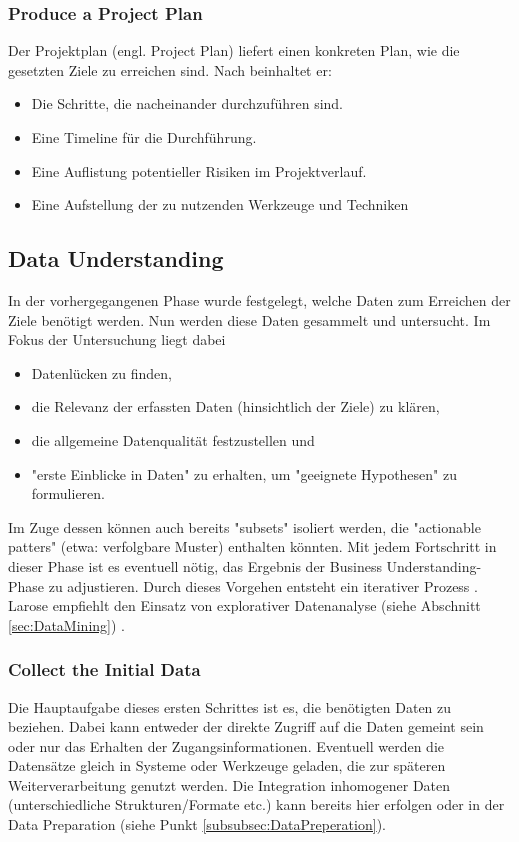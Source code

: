 \subsubsection{Produce a Project Plan}
Der Projektplan (engl. Project Plan) liefert einen konkreten Plan, wie die gesetzten Ziele zu erreichen sind. Nach \citep[S.~15]{shearer_crisp-dm_2000} beinhaltet er:
\begin{itemize}
\item Die Schritte, die nacheinander durchzuführen sind.
\item Eine Timeline für die Durchführung.
\item Eine Auflistung potentieller Risiken im Projektverlauf.
\item Eine Aufstellung der zu nutzenden Werkzeuge und Techniken \citep[S.~16]{chapman_crisp-dm_2000}
\end{itemize}


\subsection{Data Understanding}
In der vorhergegangenen Phase wurde festgelegt, welche Daten zum Erreichen der Ziele benötigt werden. Nun werden diese Daten gesammelt und untersucht. Im Fokus der Untersuchung liegt dabei\citep[S.~73]{swamynathan_mastering_2017}
\begin{itemize}
\item Datenlücken zu  finden,
\item die Relevanz der erfassten Daten (hinsichtlich der Ziele) zu klären,
\item die allgemeine Datenqualität festzustellen und
\item "erste Einblicke in Daten" zu erhalten, um "geeignete Hypothesen"\citep[S.~73; eigene Übersetzung]{swamynathan_mastering_2017} zu formulieren.
\end{itemize}
Im Zuge dessen können auch bereits "subsets" isoliert werden, die "actionable patters"\citep[Punkt 1.4.1.2.d]{larose_discovering_2014} (etwa: verfolgbare Muster) enthalten könnten. Mit jedem Fortschritt in dieser Phase ist es eventuell nötig, das Ergebnis der Business Understanding-Phase zu adjustieren. Durch dieses Vorgehen entsteht ein iterativer Prozess \citep[S.~73]{swamynathan_mastering_2017}. Larose empfiehlt den Einsatz von explorativer Datenanalyse (siehe Abschnitt \ref{sec:DataMining}) \citep[Punkt 1.4.1.2.b]{larose_discovering_2014}. 


\subsubsection{Collect the Initial Data}
Die Hauptaufgabe dieses ersten Schrittes ist es, die benötigten Daten zu beziehen. Dabei kann entweder der direkte Zugriff auf die Daten gemeint sein oder nur das Erhalten der Zugangsinformationen. Eventuell werden die Datensätze gleich in Systeme oder Werkzeuge geladen, die zur späteren Weiterverarbeitung genutzt werden. Die Integration inhomogener Daten (unterschiedliche Strukturen/Formate etc.) kann bereits hier erfolgen oder in der Data Preparation (siehe Punkt \ref{subsubsec:DataPreperation}). \citep[S.~18]{chapman_crisp-dm_2000}

